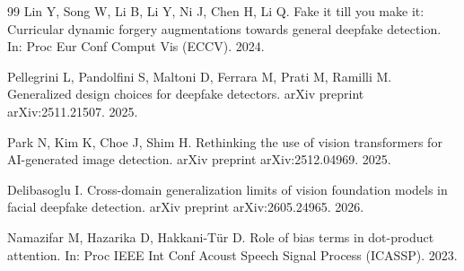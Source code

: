 \documentclass[fonts]{icst}
\begin{document}
\begin{thebibliography}{99}
Lin Y, Song W, Li B, Li Y, Ni J, Chen H, Li Q.
Fake it till you make it: Curricular dynamic forgery augmentations towards general deepfake detection.
In: Proc Eur Conf Comput Vis (ECCV). 2024.

Pellegrini L, Pandolfini S, Maltoni D, Ferrara M, Prati M, Ramilli M.
Generalized design choices for deepfake detectors.
arXiv preprint arXiv:2511.21507. 2025.

Park N, Kim K, Choe J, Shim H.
Rethinking the use of vision transformers for AI-generated image detection.
arXiv preprint arXiv:2512.04969. 2025.

Delibasoglu I.
Cross-domain generalization limits of vision foundation models in facial deepfake detection.
arXiv preprint arXiv:2605.24965. 2026.

Namazifar M, Hazarika D, Hakkani-T{\"u}r D.
Role of bias terms in dot-product attention.
In: Proc IEEE Int Conf Acoust Speech Signal Process (ICASSP). 2023.

\end{thebibliography}
\end{document}

